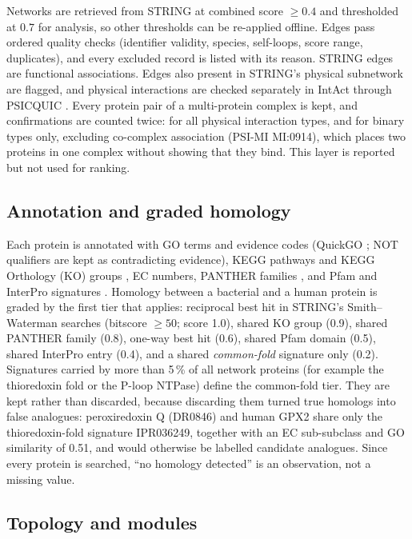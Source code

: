 \documentclass[conference]{IEEEtran}
\begin{document}
Networks are retrieved from STRING at combined score $\geq 0.4$ and thresholded at $0.7$ for
analysis, so other thresholds can be re-applied offline. Edges pass ordered quality checks
(identifier validity, species, self-loops, score range, duplicates), and every excluded record is
listed with its reason. STRING edges are functional associations. Edges also present in STRING's
physical subnetwork are flagged, and physical interactions are checked separately in IntAct
\cite{intact2022} through PSICQUIC \cite{psicquic}. Every protein pair of a multi-protein complex is
kept, and confirmations are counted twice: for all physical interaction types, and for binary types
only, excluding co-complex association (PSI-MI MI:0914), which places two proteins in one complex
without showing that they bind. This layer is reported but not used for ranking.

\subsection{Annotation and graded homology}

Each protein is annotated with GO terms and evidence codes (QuickGO \cite{quickgo}; NOT
qualifiers are kept as contradicting evidence), KEGG pathways and KEGG Orthology (KO) groups
\cite{kanehisa2000,kegg2025}, EC numbers, PANTHER families \cite{panther2022}, and Pfam and InterPro
signatures \cite{interpro2025}. Homology between a bacterial and a human protein is graded by the
first tier that applies: reciprocal best hit in STRING's Smith--Waterman searches (bitscore
$\geq 50$; score 1.0), shared KO group (0.9), shared PANTHER family (0.8), one-way best hit (0.6),
shared Pfam domain (0.5), shared InterPro entry (0.4), and a shared \emph{common-fold} signature
only (0.2). Signatures carried by more than 5\,\% of all network proteins (for example the
thioredoxin fold or the P-loop NTPase) define the common-fold tier. They are kept rather than
discarded, because discarding them turned true homologs into false analogues: peroxiredoxin Q
(DR0846) and human GPX2 share only the thioredoxin-fold signature IPR036249, together with an EC
sub-subclass and GO similarity of 0.51, and would otherwise be labelled candidate analogues.
Since every protein is searched, ``no homology detected'' is an observation, not a missing value.

\subsection{Topology and modules}
\end{document}

